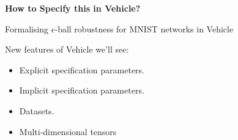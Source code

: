 \documentclass[t,compress,aspectratio=169]{beamer}
\begin{document}



\begin{frame}
\vspace {8em}

    \begin{center}
        \Huge{\textcolor{aisecred}{\textbf{How to Specify this in Vehicle?}}}
    \end{center}
\end{frame}




\begin{frame}[fragile]{Formalising $\epsilon$-ball robustness for MNIST networks in Vehicle}

New features of Vehicle we'll see:
\begin{itemize}
    \item Explicit specification parameters.
    \item Implicit specification parameters.
    \item Datasets.
    \item Multi-dimensional tensors
\end{itemize}
\end{frame}
\end{document}
